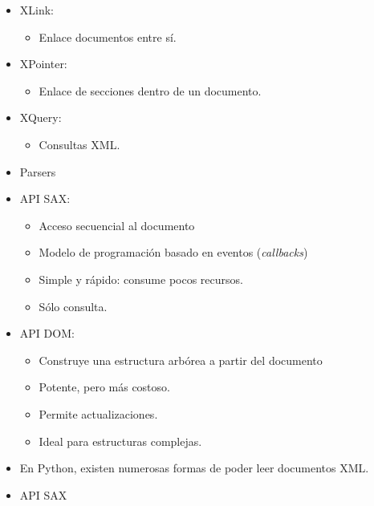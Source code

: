 \begin{itemize}[label=$-$]
\begin{itemize}[label=\textbullet]
	\end{itemize}
	\item XLink:
	\begin{itemize}[label=\textbullet]
		\item Enlace documentos entre sí.
	\end{itemize}
	\item XPointer:
	\begin{itemize}[label=\textbullet]
		\item Enlace de secciones dentro de un documento.
	\end{itemize}
	\item XQuery:
	\begin{itemize}[label=\textbullet]
		\item Consultas XML.
	\end{itemize}
\end{itemize}

\begin{itemize}[label=\color{red}\textbullet, leftmargin=*]
	\item \color{lightblue}Parsers
\end{itemize}
\begin{itemize}
	\item API SAX:
	\begin{itemize}
		\item Acceso secuencial al documento 
		\item Modelo de programación basado en eventos (\textit{callbacks})
		\item Simple y rápido: consume pocos recursos.
		\item Sólo consulta.
	\end{itemize}
	\item API DOM:
	\begin{itemize}
		\item Construye una estructura arbórea a partir del documento
		\item Potente, pero más costoso.
		\item Permite actualizaciones.
		\item Ideal para estructuras complejas.
	\end{itemize}
	\item En Python, existen numerosas formas de poder leer documentos XML.
\end{itemize}

\begin{itemize}[label=\color{red}\textbullet, leftmargin=*]
	\item \color{lightblue}API SAX
\end{itemize}

